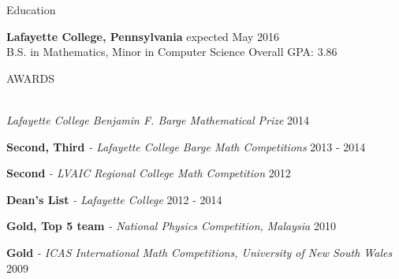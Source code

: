 \documentclass{resume} %
\begin{document}
\begin{rSection}{Education}

{\bf Lafayette College, Pennsylvania} \hfill expected May 2016\\ 
B.S. in Mathematics, Minor in Computer Science \hfill Overall GPA: 3.86
\end{rSection}



\begin{rSection}{AWARDS}

{\setlength{\parskip}{1.8pt}

\ \\
{\sl Lafayette College Benjamin F. Barge Mathematical Prize} \hfill 2014

{\bf Second, Third }{\sl - Lafayette College Barge Math Competitions } \hfill 2013 - 2014

{\bf Second }{\sl - LVAIC Regional College Math Competition} \hfill  2012

{\bf Dean's List }{\sl - Lafayette College} \hfill 2012 - 2014

{\bf Gold, Top 5 team }{\sl - National Physics Competition, Malaysia} \hfill 2010 

{\bf Gold }{\sl - ICAS International Math Competitions, University of New South Wales} \hfill  2009}
\end{rSection}


\end{document}
